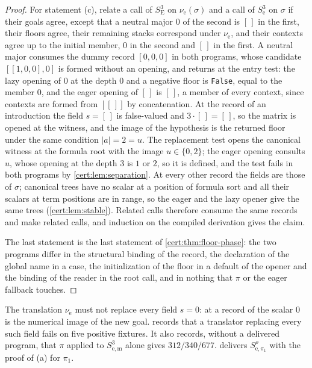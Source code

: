 \begin{proof}
For statement (c), relate a call of $S^{3}_{\mathrm E}$ on $\nu_{\mathrm e}(\sigma)$ and a
call of $S^{3}_{\mathrm e}$ on $\sigma$ if their goals agree, except that a neutral major
$0$ of the second is $[\,]$ in the first, their floors agree, their remaining stacks
correspond under $\nu_{\mathrm e}$, and their contexts agree up to the initial member,
$0$ in the second and $[\,]$ in the first. A neutral major consumes the dummy record
$[0,0,0]$ in both programs, whose candidate $[[1,0,0],0]$ is formed without an opening,
and returns at the entry test: the lazy opening of $0$ at the depth $0$ and a negative
floor is \texttt{False}, equal to the member $0$, and the eager opening of $[\,]$ is
$[\,]$, a member of every context, since contexts are formed from $[[\,]]$ by
concatenation. At the record of an introduction the field $s=[\,]$ is false-valued and
$3\cdot[\,]=[\,]$, so the matrix is opened at the witness, and the image of the
hypothesis is the returned floor under the same condition $\lvert a\rvert=2=u$. The
replacement test opens the canonical witness at the formula root with the image $u\in
\{0,2\}$; the eager opening consults $u$, whose opening at the depth $3$ is $1$ or $2$,
so it is defined, and the test fails in both programs by \cref{cert:lem:separation}.
At every other record the fields are those of $\sigma$; canonical trees have no scalar
at a position of formula sort and all their scalars at term positions are in range, so
the eager and the lazy opener give the same trees (\cref{cert:lem:stable}). Related
calls therefore consume the same records and make related calls, and induction on the
compiled derivation gives the claim.

The last statement is the last statement of \cref{cert:thm:floor-phase}: the two
programs differ in the structural binding of the record, the declaration of the global
name in a case, the initialization of the floor in a default of the opener and the
binding of the reader in the root call, and in nothing that $\pi$ or the eager fallback
touches.
\end{proof}

The translation $\nu_{\mathrm e}$ must not replace every field $s=0$: at a record of
 the scalar $0$ is the numerical image of the new goal. 
records that a translator replacing every such field fails on five positive fixtures.
It also records, without a delivered program, that $\pi$ applied to $S^{3}_{\mathrm{e,m}}$
alone gives $312/340/677$.  delivers
$S^{\rho}_{\mathrm e,\pi_1}$ with the proof of (a) for $\pi_1$.

